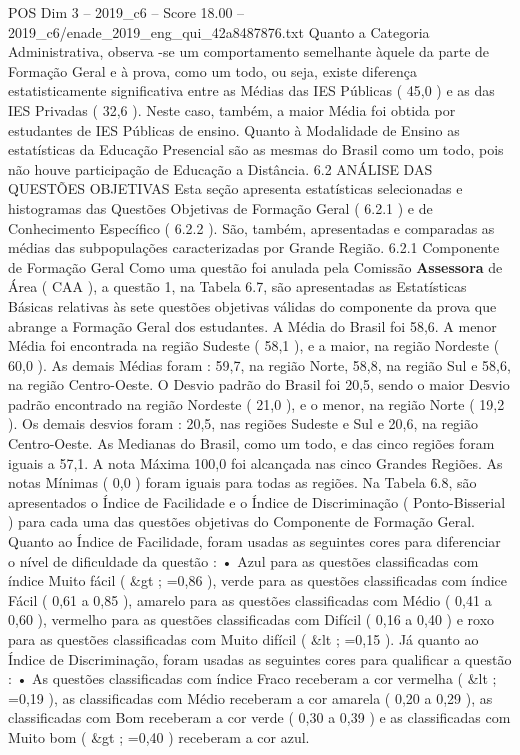 \begin{textsample}{POS Dim 3 – 2019\_c6 – Score 18.00 – 2019\_c6/enade\_2019\_eng\_qui\_42a8487876.txt}
Quanto a Categoria Administrativa, observa -se um comportamento semelhante àquele da parte de Formação Geral e à prova, como um todo, ou seja, existe diferença estatisticamente significativa entre as Médias das IES Públicas ( 45,0 ) e as das IES Privadas ( 32,6 ).
Neste caso, também, a maior Média foi obtida por estudantes de IES Públicas de ensino.
Quanto à Modalidade de Ensino as estatísticas da Educação Presencial são as mesmas do Brasil como um todo, pois não houve participação de Educação a Distância. 6.2 ANÁLISE DAS QUESTÕES OBJETIVAS Esta seção apresenta estatísticas selecionadas e histogramas das Questões Objetivas de Formação Geral ( 6.2.1 ) e de Conhecimento Específico ( 6.2.2 ).
São, também, apresentadas e comparadas as médias das subpopulações caracterizadas por Grande Região. 6.2.1 Componente de Formação Geral Como uma questão foi anulada pela Comissão \textbf{Assessora} de Área ( CAA ), a questão 1, na Tabela 6.7, são apresentadas as Estatísticas Básicas relativas às sete questões objetivas válidas do componente da prova que abrange a Formação Geral dos estudantes.
A Média do Brasil foi 58,6.
A menor Média foi encontrada na região Sudeste ( 58,1 ), e a maior, na região Nordeste ( 60,0 ).
As demais Médias foram : 59,7, na região Norte, 58,8, na região Sul e 58,6, na região Centro-Oeste.
O Desvio padrão do Brasil foi 20,5, sendo o maior Desvio padrão encontrado na região Nordeste ( 21,0 ), e o menor, na região Norte ( 19,2 ).
Os demais desvios foram : 20,5, nas regiões Sudeste e Sul e 20,6, na região Centro-Oeste.
As Medianas do Brasil, como um todo, e das cinco regiões foram iguais a 57,1.
A nota Máxima 100,0 foi alcançada nas cinco Grandes Regiões.
As notas Mínimas ( 0,0 ) foram iguais para todas as regiões.
Na Tabela 6.8, são apresentados o Índice de Facilidade e o Índice de Discriminação ( Ponto-Bisserial ) para cada uma das questões objetivas do Componente de Formação Geral.
Quanto ao Índice de Facilidade, foram usadas as seguintes cores para diferenciar o nível de dificuldade da questão : • Azul para as questões classificadas com índice Muito fácil ( \&gt ; =0,86 ), verde para as questões classificadas com índice Fácil ( 0,61 a 0,85 ), amarelo para as questões classificadas com Médio ( 0,41 a 0,60 ), vermelho para as questões classificadas com Difícil ( 0,16 a 0,40 ) e roxo para as questões classificadas com Muito difícil ( \&lt ; =0,15 ).
Já quanto ao Índice de Discriminação, foram usadas as seguintes cores para qualificar a questão : • As questões classificadas com índice Fraco receberam a cor vermelha ( \&lt ; =0,19 ), as classificadas com Médio receberam a cor amarela ( 0,20 a 0,29 ), as classificadas com Bom receberam a cor verde ( 0,30 a 0,39 ) e as classificadas com Muito bom ( \&gt ; =0,40 ) receberam a cor azul.

\end{textsample}
